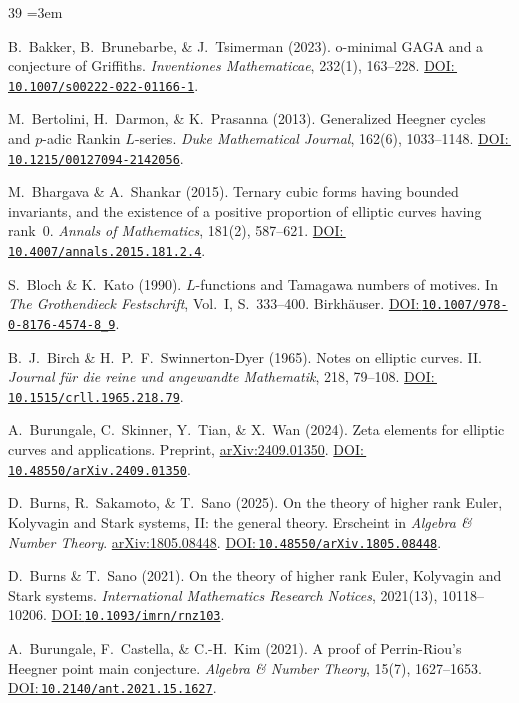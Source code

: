\documentclass[aps,prd,twocolumn,superscriptaddress,nofootinbib,floatfix]{revtex4-2}
\newcommand{\doilink}[1]{\href{https://doi.org/#1}{DOI:\,\nolinkurl{#1}}}
\theoremstyle{definition}
\theoremstyle{remark}
\begin{document}
\begin{thebibliography}{39}
\sloppy
\emergencystretch=3em
\setlength{\itemsep}{0pt}
\setlength{\parskip}{0pt}

B.~Bakker, B.~Brunebarbe, \& J.~Tsimerman (2023).
o-minimal GAGA and a conjecture of Griffiths.
\textit{Inventiones Mathematicae}, 232(1), 163--228.
\doilink{10.1007/s00222-022-01166-1}.

M.~Bertolini, H.~Darmon, \& K.~Prasanna (2013).
Generalized Heegner cycles and $p$-adic Rankin $L$-series.
\textit{Duke Mathematical Journal}, 162(6), 1033--1148.
\doilink{10.1215/00127094-2142056}.

M.~Bhargava \& A.~Shankar (2015).
Ternary cubic forms having bounded invariants, and the existence of a positive proportion of elliptic curves having rank~0.
\textit{Annals of Mathematics}, 181(2), 587--621.
\doilink{10.4007/annals.2015.181.2.4}.

S.~Bloch \& K.~Kato (1990).
$L$-functions and Tamagawa numbers of motives.
In \textit{The Grothendieck Festschrift}, Vol.~I, S.\ 333--400. Birkhäuser.
\doilink{10.1007/978-0-8176-4574-8\_9}.

B.~J.~Birch \& H.~P.~F.~Swinnerton-Dyer (1965).
Notes on elliptic curves. II.
\textit{Journal für die reine und angewandte Mathematik}, 218, 79--108.
\doilink{10.1515/crll.1965.218.79}.

A.~Burungale, C.~Skinner, Y.~Tian, \& X.~Wan (2024).
Zeta elements for elliptic curves and applications.
Preprint, \href{https://arxiv.org/abs/2409.01350}{arXiv:2409.01350}.
\doilink{10.48550/arXiv.2409.01350}.

D.~Burns, R.~Sakamoto, \& T.~Sano (2025).
On the theory of higher rank Euler, Kolyvagin and Stark systems, II: the general theory.
Erscheint in \textit{Algebra \& Number Theory}.
\href{https://arxiv.org/abs/1805.08448}{arXiv:1805.08448}.
\doilink{10.48550/arXiv.1805.08448}.

D.~Burns \& T.~Sano (2021).
On the theory of higher rank Euler, Kolyvagin and Stark systems.
\textit{International Mathematics Research Notices}, 2021(13), 10118--10206.
\doilink{10.1093/imrn/rnz103}.

A.~Burungale, F.~Castella, \& C.-H.~Kim (2021).
A proof of Perrin-Riou's Heegner point main conjecture.
\textit{Algebra \& Number Theory}, 15(7), 1627--1653.
\doilink{10.2140/ant.2021.15.1627}.


\end{thebibliography}
\end{document}
